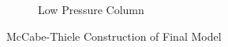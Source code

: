 \begin{figure}[ht]
\begin{subfigure}{0.49\textwidth}
            \caption{Low Pressure Column}
            \label{fig:LPC_v1}
        \end{subfigure}
        \caption{McCabe-Thiele Construction of Final Model}                        \label{fig:mccabe_v1}
    \end{figure}
    
%